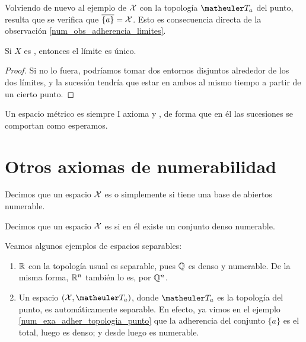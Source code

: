 \begin{exa}
	\label{num_exa_adher_topologia_punto}
	Volviendo de nuevo al ejemplo de $\mathcal{X}$ con la topología $\T_a$ del punto, resulta que se verifica que $\overline{\{a\}}=\mathcal{X}$. Esto es consecuencia directa de la observación \ref{num_obs_adherencia_limites}.
\end{exa}

\begin{prop}
	Si $X$ es \hausdorff, entonces el límite es único.
	
	\begin{proof}
		Si no lo fuera, podríamos tomar dos entornos disjuntos alrededor de los dos límites, y la sucesión tendría que estar en ambos al mismo tiempo a partir de un cierto punto.
	\end{proof}
\end{prop}

\begin{obs}
	Un espacio métrico es siempre I axioma y \hausdorff, de forma que en él las sucesiones se comportan como esperamos.
\end{obs}

\section{Otros axiomas de numerabilidad}

\begin{defi}
	Decimos que un espacio $\mathcal{X}$ es  o simplemente  si tiene una base de abiertos numerable.
\end{defi}

\begin{defi}[Separable]
	Decimos que un espacio $\mathcal{X}$ es  si en él existe un conjunto denso numerable.
\end{defi}

\begin{exa}
	Veamos algunos ejemplos de espacios separables:
	\begin{enumerate}
		\item $\mathbb{R}$ con la topología usual es separable, pues $\mathbb{Q}$ es denso y numerable. De la misma forma, $\mathbb{R}^n$ también lo es, por $\mathbb{Q}^n$. 
		
		\item Un espacio $(\X,\T_a)$, donde $\T_a$ es la topología del punto, es automáticamente separable. En efecto, ya vimos en el ejemplo \ref{num_exa_adher_topologia_punto} que la adherencia del conjunto $\{a\}$ es el total, luego es denso; y desde luego es numerable. \qedhere
	\end{enumerate}
\end{exa}

